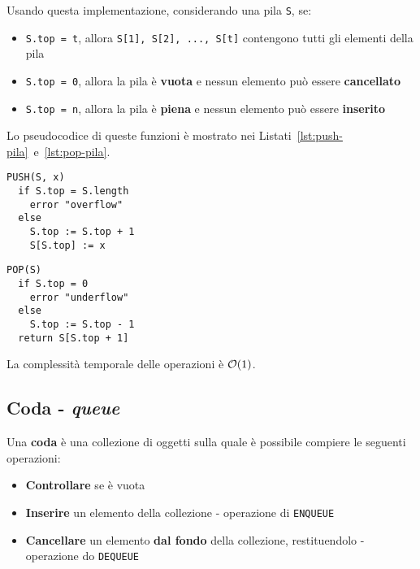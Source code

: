 \documentclass[italian, 10pt]{article}
\begin{document}
Usando questa implementazione, considerando una pila \texttt{S}, se:

\begin{itemize}
  \item \texttt{S.top = t}, allora \texttt{S[1], S[2], ..., S[t]} contengono tutti gli elementi della pila
  \item \texttt{S.top = 0}, allora la pila è \textbf{vuota} e nessun elemento può essere \textbf{cancellato}
  \item \texttt{S.top = n}, allora la pila è \textbf{piena} e nessun elemento può essere \textbf{inserito}
\end{itemize}

\bigskip
Lo pseudocodice di queste funzioni è mostrato nei Listati~\ref{lst:push-pila}~e~\ref{lst:pop-pila}.

\begin{minipage}[t]{0.495\textwidth}
  \begin{lstlisting}[style=pseudocode, caption={\texttt{PUSH} in pila}, label={lst:push-pila}]
PUSH(S, x)
  if S.top = S.length
    error "overflow"
  else
    S.top := S.top + 1
    S[S.top] := x
  \end{lstlisting}
\end{minipage}
\begin{minipage}[t]{0.495\textwidth}
  \begin{lstlisting}[style=pseudocode, caption={\texttt{POP} in pila}, label={lst:pop-pila}]
POP(S)
  if S.top = 0
    error "underflow"
  else
    S.top := S.top - 1
  return S[S.top + 1]
  \end{lstlisting}
\end{minipage}

La complessità temporale delle operazioni è \(\mathcal{O}(1)\).

\subsection{Coda - \textit{queue}}

Una \textbf{coda} è una collezione di oggetti sulla quale è possibile compiere le seguenti operazioni:

\begin{itemize}
  \item \textbf{Controllare} se è vuota
  \item \textbf{Inserire} un elemento della collezione - operazione di \texttt{ENQUEUE}
  \item \textbf{Cancellare} un elemento \textbf{dal fondo} della collezione, restituendolo - operazione do \texttt{DEQUEUE}
\end{itemize}
\end{document}
